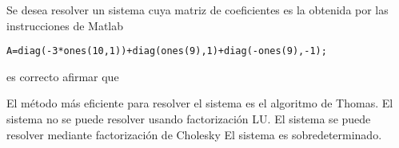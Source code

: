 \begin{pregunta}
\begin{cuerpo}
Se desea resolver un sistema cuya matriz de coeficientes es la obtenida por las instrucciones de Matlab
\begin{lstlisting}
A=diag(-3*ones(10,1))+diag(ones(9),1)+diag(-ones(9),-1);
\end{lstlisting}
es correcto afirmar que
\end{cuerpo}
\begin{alternativas}
{El m\'etodo m\'as eficiente para resolver el sistema es el algoritmo de Thomas.}
{El sistema no se puede resolver usando factorizaci\'on LU.}
{El sistema se puede resolver mediante factorizaci\'on de Cholesky}
{El sistema es sobredeterminado.}
\end{alternativas}
\justificacion{0cm}
\end{pregunta}